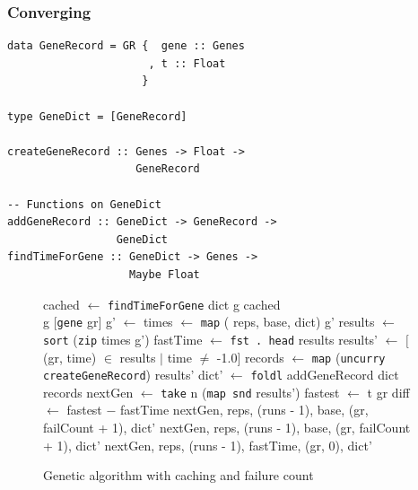 \documentclass[preprint,nocopyrightspace]{sigplanconf}
\begin{document}
\subsubsection{Converging}
\begin{lstlisting}[float,frame=single,caption=Datatypes for improved genetic algorithm,label=lst:improved]
data GeneRecord = GR {  gene :: Genes
                      , t :: Float
                     }

type GeneDict = [GeneRecord]

createGeneRecord :: Genes -> Float -> 
                    GeneRecord

-- Functions on GeneDict
addGeneRecord :: GeneDict -> GeneRecord -> 
                 GeneDict
findTimeForGene :: GeneDict -> Genes -> 
                   Maybe Float
\end{lstlisting}
\begin{figure}[t]
\begin{algorithmic}

\State cached $\gets$ \lstinline!findTimeForGene! dict g
\State\Return{}
\EndIf
\State\Return cached
\EndFunction\\

 \State\Return g
 \State\Return $[$\lstinline!gene! gr$]$
\EndIf
\State g' $\gets$ 
\State times $\gets$ \lstinline!map! ( {reps, base, dict}) g'
\State results $\gets$ \lstinline!sort! (\lstinline!zip! times g')
\State fastTime $\gets$ \lstinline!fst . head! results
\State results' $\gets$ $[$(gr, time) $\in$ results $\mid$ time $\not=$ -1.0$]$
\State records $\gets$ \lstinline!map! (\lstinline!uncurry createGeneRecord!) results'
\State dict' $\gets$ \lstinline!foldl! addGeneRecord dict records
\State nextGen $\gets$ \lstinline!take! n (\lstinline!map snd! results')
\State\Return{}
\EndIf
\State fastest $\gets$ t gr
\State diff $\gets$ fastest $-$ fastTime
 \State\Return{} {nextGen, reps, (runs - 1), base, (gr, failCount + 1), dict'}
 \State\Return{} {nextGen, reps, (runs - 1), base, (gr, failCount + 1), dict'}
\Else \State\Return{} {nextGen, reps, (runs - 1), fastTime, (gr, 0), dict'}
\EndIf

\EndFunction
\end{algorithmic}
\caption{Genetic algorithm with caching and failure count}
\label{alg:converge}
\end{figure}
\end{document}
